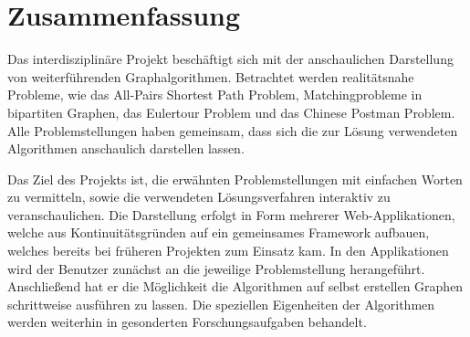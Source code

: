 \cleardoublepage



\section*{Zusammenfassung}
Das interdisziplinäre Projekt beschäftigt sich mit der anschaulichen Darstellung von weiterführenden Graphalgorithmen. Betrachtet werden realitätsnahe Probleme, wie das All-Pairs Shortest Path Problem, Matchingprobleme in bipartiten Graphen, das Eulertour Problem und das Chinese Postman Problem. Alle Problemstellungen haben gemeinsam, dass sich die zur Lösung verwendeten Algorithmen anschaulich darstellen lassen.

Das Ziel des Projekts ist, die erwähnten Problemstellungen mit einfachen Worten zu vermitteln, sowie die verwendeten Lösungsverfahren interaktiv zu veranschaulichen. Die Darstellung erfolgt in Form mehrerer Web-Applikationen, welche aus Kontinuitätsgründen auf ein gemeinsames Framework aufbauen, welches bereits bei früheren Projekten zum Einsatz kam. In den Applikationen wird der Benutzer zunächst an die jeweilige Problemstellung herangeführt. Anschließend hat er die Möglichkeit die Algorithmen auf selbst erstellen Graphen schrittweise ausführen zu lassen. Die speziellen Eigenheiten der Algorithmen werden weiterhin in gesonderten Forschungsaufgaben behandelt. 


